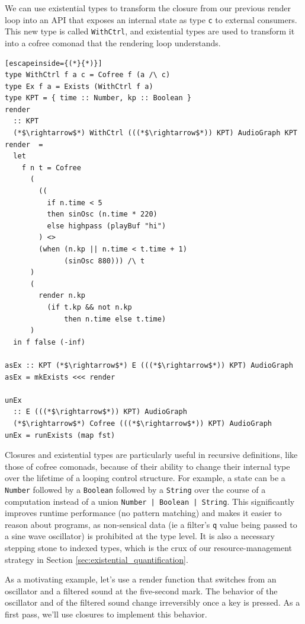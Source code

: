 \documentclass{article}
\begin{document}
We can use existential types to transform the closure from our previous render loop into an API that exposes an internal state as type \texttt{c} to external consumers. This new type is called \texttt{WithCtrl}, and existential types are used to transform it into a cofree comonad that the rendering loop understands.

\lstset{language=Haskell, style=psstyle}
\begin{lstlisting}[escapeinside={(*}{*)}]
type WithCtrl f a c = Cofree f (a /\ c)
type Ex f a = Exists (WithCtrl f a)
type KPT = { time :: Number, kp :: Boolean }
render
  :: KPT
  (*$\rightarrow$*) WithCtrl (((*$\rightarrow$*)) KPT) AudioGraph KPT
render  =
  let
    f n t = Cofree
      (
        ((
          if n.time < 5
          then sinOsc (n.time * 220)
          else highpass (playBuf "hi")
        ) <>
        (when (n.kp || n.time < t.time + 1)
              (sinOsc 880))) /\ t
      )
      (
        render n.kp
          (if t.kp && not n.kp
              then n.time else t.time)
      )
  in f false (-inf)

asEx :: KPT (*$\rightarrow$*) E (((*$\rightarrow$*)) KPT) AudioGraph
asEx = mkExists <<< render

unEx
  :: E (((*$\rightarrow$*)) KPT) AudioGraph
  (*$\rightarrow$*) Cofree (((*$\rightarrow$*)) KPT) AudioGraph
unEx = runExists (map fst)
\end{lstlisting}

Closures and existential types are particularly useful in recursive definitions, like those of cofree comonads, because of their ability to change their internal type over the lifetime of a looping control structure. For example, a state can be a \texttt{Number} followed by a \texttt{Boolean} followed by a \texttt{String} over the course of a computation instead of a union \texttt{Number | Boolean | String}. This significantly improves runtime performance (no pattern matching) and makes it easier to reason about programs, as non-sensical data (ie a filter's \texttt{q} value being passed to a sine wave oscillator) is prohibited at the type level. It is also a necessary stepping stone to indexed types, which is the crux of our resource-management strategy in Section \ref{sec:existential_quantification}.

As a motivating example, let's use a render function that switches from an oscillator and a filtered sound at the five-second mark. The behavior of the oscillator and of the filtered sound change irreversibly once a key is pressed. As a first pass, we'll use closures to implement this behavior.
\end{document}
